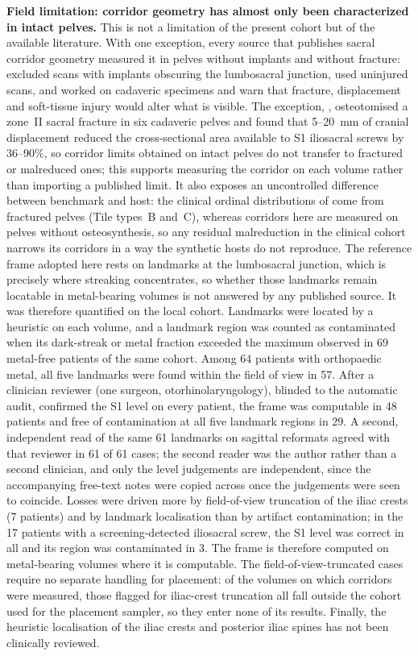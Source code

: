 \documentclass[9pt]{extarticle}
\begin{document}
\textbf{Field limitation: corridor geometry has almost only been characterized in intact pelves.} This is not a limitation of the present cohort but of the available literature. With one exception, every source that publishes sacral corridor geometry measured it in pelves without implants and without fracture: \citet{kaiser2014dysmorphism} excluded scans with implants obscuring the lumbosacral junction, \citet{mclaren2021corridor} used uninjured scans, and \citet{ziran2007fluoroscopic} worked on cadaveric specimens and warn that fracture, displacement and soft-tissue injury would alter what is visible. The exception, \citet{reilly2003effect}, osteotomised a zone~II sacral fracture in six cadaveric pelves and found that 5--20~mm of cranial displacement reduced the cross-sectional area available to S1 iliosacral screws by 36--90\%, so corridor limits obtained on intact pelves do not transfer to fractured or malreduced ones; this supports measuring the corridor on each volume rather than importing a published limit. It also exposes an uncontrolled difference between benchmark and host: the clinical ordinal distributions of \citet{zwingmann2009navigated} come from fractured pelves (Tile types~B and~C), whereas corridors here are measured on pelves without osteosynthesis, so any residual malreduction in the clinical cohort narrows its corridors in a way the synthetic hosts do not reproduce. The reference frame adopted here rests on landmarks at the lumbosacral junction, which is precisely where streaking concentrates, so whether those landmarks remain locatable in metal-bearing volumes is not answered by any published source. It was therefore quantified on the local cohort. Landmarks were located by a heuristic on each volume, and a landmark region was counted as contaminated when its dark-streak or metal fraction exceeded the maximum observed in 69 metal-free patients of the same cohort. Among 64 patients with orthopaedic metal, all five landmarks were found within the field of view in 57. After a clinician reviewer (one surgeon, otorhinolaryngology), blinded to the automatic audit, confirmed the S1 level on every patient, the frame was computable in 48 patients and free of contamination at all five landmark regions in 29. A second, independent read of the same 61 landmarks on sagittal reformats agreed with that reviewer in 61 of 61 cases; the second reader was the author rather than a second clinician, and only the level judgements are independent, since the accompanying free-text notes were copied across once the judgements were seen to coincide. Losses were driven more by field-of-view truncation of the iliac crests (7 patients) and by landmark localisation than by artifact contamination; in the 17 patients with a screening-detected iliosacral screw, the S1 level was correct in all and its region was contaminated in 3. The frame is therefore computed on metal-bearing volumes where it is computable. The field-of-view-truncated cases require no separate handling for placement: of the volumes on which corridors were measured, those flagged for iliac-crest truncation all fall outside the cohort used for the placement sampler, so they enter none of its results. Finally, the heuristic localisation of the iliac crests and posterior iliac spines has not been clinically reviewed.
\end{document}
